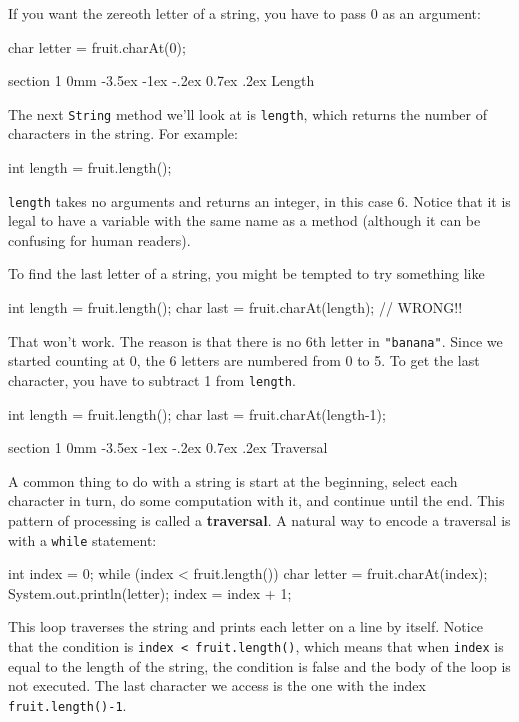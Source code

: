 \documentclass{book}
\makeatletter
\renewcommand{\section}{\@startsection 
    {section} {1} {0mm}%
    {-3.5ex \@plus -1ex \@minus -.2ex}%
    {0.7ex \@plus.2ex}%
    {\normalfont\Large\bfseries}}
\makeatother
\begin{document}
If you want the zereoth letter of a string, you have to pass
0 as an argument:

\begin{verbatimtab}
    char letter = fruit.charAt(0);
\end{verbatimtab}


\section{Length}

The next {\tt String} method we'll look at is {\tt length}, which
returns the number of characters in the string.  For example:

\begin{verbatimtab}
    int length = fruit.length();
\end{verbatimtab}
%
{\tt length} takes no arguments
and returns an integer, in this case 6.  Notice that it is
legal to have a variable with the same name as a method (although
it can be confusing for human readers).

To find the last letter of a string, you might be tempted to
try something like

\begin{verbatimtab}
    int length = fruit.length();
    char last = fruit.charAt(length);       // WRONG!!
\end{verbatimtab}
%
That won't work.  The reason is that there is no 6th letter
in {\tt "banana"}.  Since we started counting at 0, the 6
letters are numbered from 0 to 5.  To get the last character,
you have to subtract 1 from {\tt length}.

\begin{verbatimtab}
    int length = fruit.length();
    char last = fruit.charAt(length-1);
\end{verbatimtab}


\section{Traversal}
\label{traverse}

A common thing to do with a string is
start at the beginning, select each character in turn, do
some computation with it, and continue until the end.  This pattern
of processing is called a {\bf traversal}.  A natural
way to encode a traversal is with a {\tt while} statement:

\begin{verbatimtab}
    int index = 0;
    while (index < fruit.length()) {
      char letter = fruit.charAt(index);
      System.out.println(letter);
      index = index + 1;
    }
\end{verbatimtab}
%
This loop traverses the string and prints each letter on
a line by itself.  Notice that the condition is
{\tt index < fruit.length()}, which means that when
{\tt index} is equal to the length of the string, the
condition is false and the body of the loop is not executed.
The last character we access is the one with the
index {\tt fruit.length()-1}.
\end{document}
